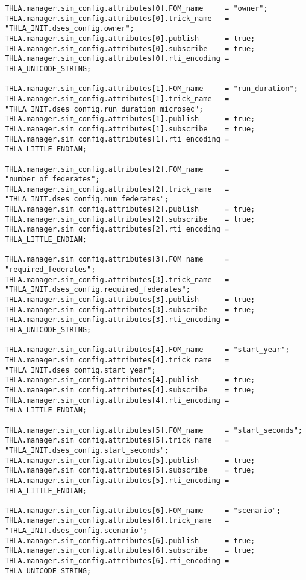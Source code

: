\begin{lstlisting}[caption={{\tt SIM\_simplesine\_hla\_join} input file},label={list:SIM-simplesine-hla-join-input}]
THLA.manager.sim_config.attributes[0].FOM_name     = "owner";
THLA.manager.sim_config.attributes[0].trick_name   = "THLA_INIT.dses_config.owner";
THLA.manager.sim_config.attributes[0].publish      = true;
THLA.manager.sim_config.attributes[0].subscribe    = true;
THLA.manager.sim_config.attributes[0].rti_encoding = THLA_UNICODE_STRING;

THLA.manager.sim_config.attributes[1].FOM_name     = "run_duration";
THLA.manager.sim_config.attributes[1].trick_name   = "THLA_INIT.dses_config.run_duration_microsec";
THLA.manager.sim_config.attributes[1].publish      = true;
THLA.manager.sim_config.attributes[1].subscribe    = true;
THLA.manager.sim_config.attributes[1].rti_encoding = THLA_LITTLE_ENDIAN;

THLA.manager.sim_config.attributes[2].FOM_name     = "number_of_federates";
THLA.manager.sim_config.attributes[2].trick_name   = "THLA_INIT.dses_config.num_federates";
THLA.manager.sim_config.attributes[2].publish      = true;
THLA.manager.sim_config.attributes[2].subscribe    = true;
THLA.manager.sim_config.attributes[2].rti_encoding = THLA_LITTLE_ENDIAN;

THLA.manager.sim_config.attributes[3].FOM_name     = "required_federates";
THLA.manager.sim_config.attributes[3].trick_name   = "THLA_INIT.dses_config.required_federates";
THLA.manager.sim_config.attributes[3].publish      = true;
THLA.manager.sim_config.attributes[3].subscribe    = true;
THLA.manager.sim_config.attributes[3].rti_encoding = THLA_UNICODE_STRING;

THLA.manager.sim_config.attributes[4].FOM_name     = "start_year";
THLA.manager.sim_config.attributes[4].trick_name   = "THLA_INIT.dses_config.start_year";
THLA.manager.sim_config.attributes[4].publish      = true;
THLA.manager.sim_config.attributes[4].subscribe    = true;
THLA.manager.sim_config.attributes[4].rti_encoding = THLA_LITTLE_ENDIAN;

THLA.manager.sim_config.attributes[5].FOM_name     = "start_seconds";
THLA.manager.sim_config.attributes[5].trick_name   = "THLA_INIT.dses_config.start_seconds";
THLA.manager.sim_config.attributes[5].publish      = true;
THLA.manager.sim_config.attributes[5].subscribe    = true;
THLA.manager.sim_config.attributes[5].rti_encoding = THLA_LITTLE_ENDIAN;

THLA.manager.sim_config.attributes[6].FOM_name     = "scenario";
THLA.manager.sim_config.attributes[6].trick_name   = "THLA_INIT.dses_config.scenario";
THLA.manager.sim_config.attributes[6].publish      = true;
THLA.manager.sim_config.attributes[6].subscribe    = true;
THLA.manager.sim_config.attributes[6].rti_encoding = THLA_UNICODE_STRING;


\end{lstlisting}
